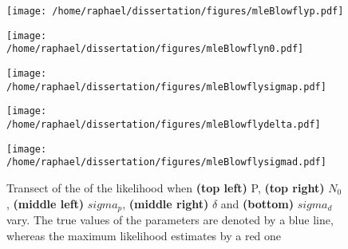 \documentclass[12pt]{article}
\begin{document}
\begin{appendices}
	\begin{figure}[htb]
		\centering
		\begin{minipage}{0.49\textwidth}
			\centering
			\texttt{[image: /home/raphael/dissertation/figures/mleBlowflyp.pdf]}
		\end{minipage}
		\begin{minipage}{0.49\textwidth}
			\centering
			\texttt{[image: /home/raphael/dissertation/figures/mleBlowflyn0.pdf]}
		\end{minipage}
		\begin{minipage}{0.49\textwidth}
			\centering
			\texttt{[image: /home/raphael/dissertation/figures/mleBlowflysigmap.pdf]}
		\end{minipage}
		\begin{minipage}{0.49\textwidth}
			\centering
			\texttt{[image: /home/raphael/dissertation/figures/mleBlowflydelta.pdf]}
		\end{minipage}
		\begin{minipage}{0.49\textwidth}
			\centering
			\texttt{[image: /home/raphael/dissertation/figures/mleBlowflysigmad.pdf]}
		\end{minipage}
		\caption[Transect of the log-likelihood with respect to each of the parameters of Nicholson's blowfly model]{Transect of the of the likelihood when \textbf{(top left)} P, \textbf{(top right)} $N_0$,  \textbf{(middle left)} $sigma_p$, \textbf{(middle right)} $\delta$ and \textbf{(bottom)} $sigma_d$ vary. The true values of the parameters are denoted by a blue line, whereas the maximum likelihood estimates by a red one}
		\label{fig:transectBlow}
	\end{figure}

\end{appendices}
\end{document}
